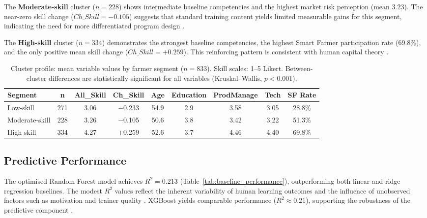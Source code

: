 \documentclass[3p,twocolumn,authoryear]{elsarticle}
\begin{document}
The \textbf{Moderate-skill} cluster ($n = 228$) shows intermediate
baseline competencies and the highest market risk perception
(mean 3.23).
The near-zero skill change ($Ch\_Skill = -0.105$) suggests that standard
training content yields limited measurable gains for this segment,
indicating the need for more differentiated program design
\citep{anderson2004}.

The \textbf{High-skill} cluster ($n = 334$) demonstrates the strongest
baseline competencies, the highest Smart Farmer participation rate
(69.8\%), and the only positive mean skill change
($Ch\_Skill = +0.259$).
This reinforcing pattern is consistent with human capital theory
\citep{feder1985,davis2012}.

\begin{table}[htbp]
\centering
\caption{Cluster profile: mean variable values by farmer segment
($n = 833$). Skill scales: 1--5 Likert. Between-cluster differences
are statistically significant for all variables (Kruskal--Wallis,
$p < 0.001$).}
\label{tab:cluster_profile}
\begin{tabular}{@{}lcccccccc@{}}
\toprule
\textbf{Segment} & \textbf{n} & \textbf{All\_Skill}
& \textbf{Ch\_Skill} & \textbf{Age}
& \textbf{Education} & \textbf{ProdManage}
& \textbf{Tech} & \textbf{SF Rate} \\
\midrule
Low-skill      & 271 & 3.06 & $-$0.233 & 54.9 & 2.9 & 3.58 & 3.05 & 28.8\% \\
Moderate-skill & 228 & 3.26 & $-$0.105 & 50.6 & 3.8 & 3.42 & 3.22 & 51.3\% \\
High-skill     & 334 & 4.27 & $+$0.259 & 52.6 & 3.7 & 4.46 & 4.40 & 69.8\% \\
\bottomrule
\end{tabular}
\end{table}

\subsection{Predictive Performance}

The optimised Random Forest model achieves $R^{2} = 0.213$
(Table~\ref{tab:baseline_performance}), outperforming both linear and
ridge regression baselines.
The modest $R^{2}$ values reflect the inherent variability of human
learning outcomes and the influence of unobserved factors such as
motivation and trainer quality \citep{davis2012}.
XGBoost yields comparable performance ($R^{2} \approx 0.21$), supporting
the robustness of the predictive component \citep{chen2016}.
\end{document}
